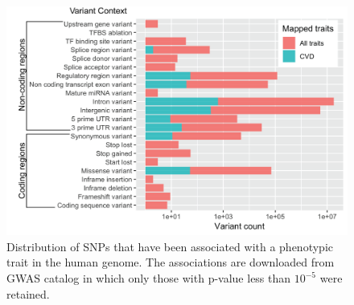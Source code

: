 \documentclass[letter]{bioinfo}
\begin{document}
	\begin{figure}[!tpb]
		\includegraphics[width=1\linewidth]{variant_contexts}
		\caption{Distribution of SNPs that have been associated with a phenotypic trait in the human genome. The associations are downloaded from GWAS catalog \citep{MacArthur:2017:new} in which only those with p-value less than $10^{-5}$ were retained.}
		\label{fig:variant_context}
	\end{figure}
	
\end{document}
